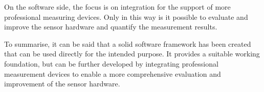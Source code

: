 On the software side, the focus is on integration for the support of
more professional measuring devices. Only in this way is it possible to
evaluate and improve the sensor hardware and quantify the measurement
results.

To summarise, it can be said that a solid software framework has been
created that can be used directly for the intended purpose. It provides
a suitable working foundation, but can be further developed by
integrating professional measurement devices to enable a more
comprehensive evaluation and improvement of the sensor hardware.

